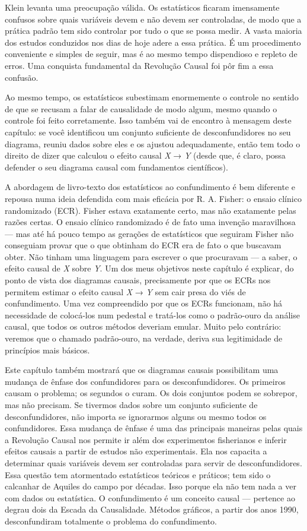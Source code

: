\documentclass[11pt,a5paper,twoside]{book}
\begin{document}
Klein levanta uma preocupação válida. Os estatísticos ficaram imensamente confusos sobre quais variáveis devem e não devem ser controladas, de modo que a prática padrão tem sido controlar por tudo o que se possa medir. A vasta maioria dos estudos conduzidos nos dias de hoje adere a essa prática. É um procedimento conveniente e simples de seguir, mas é ao mesmo tempo dispendioso e repleto de erros. Uma conquista fundamental da Revolução Causal foi pôr fim a essa confusão.

Ao mesmo tempo, os estatísticos subestimam enormemente o controle no sentido de que se recusam a falar de causalidade de modo algum, mesmo quando o controle foi feito corretamente. Isso também vai de encontro à mensagem deste capítulo: se você identificou um conjunto suficiente de desconfundidores no seu diagrama, reuniu dados sobre eles e os ajustou adequadamente, então tem todo o direito de dizer que calculou o efeito causal \textit{X} → \textit{Y} (desde que, é claro, possa defender o seu diagrama causal com fundamentos científicos).

A abordagem de livro-texto dos estatísticos ao confundimento é bem diferente e repousa numa ideia defendida com mais eficácia por R. A. Fisher: o ensaio clínico randomizado (ECR). Fisher estava exatamente certo, mas não exatamente pelas razões certas. O ensaio clínico randomizado é de fato uma invenção maravilhosa — mas até há pouco tempo as gerações de estatísticos que seguiram Fisher não conseguiam provar que o que obtinham do ECR era de fato o que buscavam obter. Não tinham uma linguagem para escrever o que procuravam — a saber, o efeito causal de \textit{X} sobre \textit{Y}. Um dos meus objetivos neste capítulo é explicar, do ponto de vista dos diagramas causais, precisamente por que os ECRs nos permitem estimar o efeito causal \textit{X} → \textit{Y} sem cair presa do viés de confundimento. Uma vez compreendido por que os ECRs funcionam, não há necessidade de colocá-los num pedestal e tratá-los como o padrão-ouro da análise causal, que todos os outros métodos deveriam emular. Muito pelo contrário: veremos que o chamado padrão-ouro, na verdade, deriva sua legitimidade de princípios mais básicos.

Este capítulo também mostrará que os diagramas causais possibilitam uma mudança de ênfase dos confundidores para os desconfundidores. Os primeiros causam o problema; os segundos o curam. Os dois conjuntos podem se sobrepor, mas não precisam. Se tivermos dados sobre um conjunto suficiente de desconfundidores, não importa se ignorarmos alguns ou mesmo todos os confundidores. Essa mudança de ênfase é uma das principais maneiras pelas quais a Revolução Causal nos permite ir além dos experimentos fisherianos e inferir efeitos causais a partir de estudos não experimentais. Ela nos capacita a determinar quais variáveis devem ser controladas para servir de desconfundidores. Essa questão tem atormentado estatísticos teóricos e práticos; tem sido o calcanhar de Aquiles do campo por décadas. Isso porque ela não tem nada a ver com dados ou estatística. O confundimento é um conceito causal — pertence ao degrau dois da Escada da Causalidade. Métodos gráficos, a partir dos anos 1990, desconfundiram totalmente o problema do confundimento.
\end{document}
